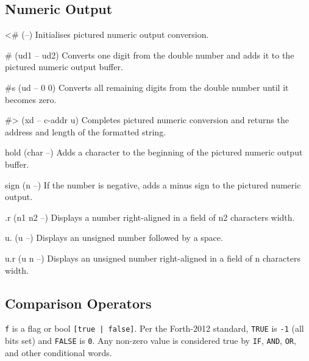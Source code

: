 \documentclass[a4paper, 11pt, openany]{book}
\begin{document}
\subsection{Numeric Output}

\begin{forthbox}
  <#       (--)
           Initialises pictured numeric output conversion.

  #        (ud1 -- ud2)
           Converts one digit from the double number and adds it
           to the pictured numeric output buffer.

  #s       (ud -- 0 0)
           Converts all remaining digits from the double number
           until it becomes zero.

  #>       (xd -- c-addr u)
           Completes pictured numeric conversion and returns the
           address and length of the formatted string.

  hold     (char --)
           Adds a character to the beginning of the pictured
           numeric output buffer.

  sign     (n --)
           If the number is negative, adds a minus sign to the
           pictured numeric output.

  .r       (n1 n2 --)
           Displays a number right-aligned in a field of n2
           characters width.

  u.       (u --)
           Displays an unsigned number followed by a space.

  u.r      (u n --)
           Displays an unsigned number right-aligned in a field
           of n characters width.
\end{forthbox}

\subsection{Comparison Operators}

\begin{notebox}
\texttt{f} is a flag or bool \texttt{[true\,|\,false]}. Per the Forth-2012 standard, \texttt{TRUE} is \texttt{-1} (all bits set) and \texttt{FALSE} is \texttt{0}. Any non-zero value is considered true by \texttt{IF}, \texttt{AND}, \texttt{OR}, and other conditional words.
\end{notebox}
\end{document}
